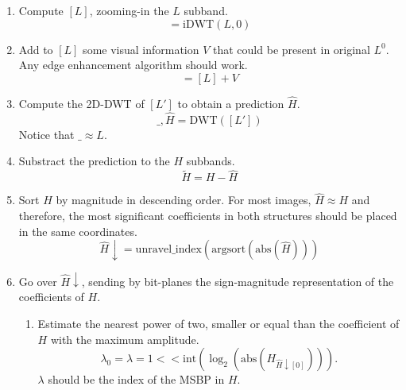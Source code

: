 \begin{enumerate}

\item Compute $[L]$, zooming-in the $L$ subband.
  \begin{equation}
    [L] = \text{iDWT}(L, 0)
  \end{equation}
  
\item Add to $[L]$ some visual information $V$ that could be present
  in original $L^0$. Any edge enhancement algorithm should work.
  \begin{equation}
    [L'] = [L] + V
  \end{equation}

\item Compute the 2D-DWT of $[L']$ to obtain a prediction $\hat{H}$.
  \begin{equation}
    \_, \hat{H} = \text{DWT}([L'])
  \end{equation}
  Notice that $\_\approx L$.

\item Substract the prediction to the $H$ subbands.
  \begin{equation}
    \tilde{H} = H-\hat{H}
  \end{equation}

\item Sort $\hat{H}$ by magnitude in descending order. For most
  images, $\hat{H}\approx H$ and therefore, the most significant
  coefficients in both structures should be placed in the same
  coordinates.
  \begin{equation}
    \hat{H}\downarrow = \text{unravel\_index}(\text{argsort}(\text{abs}(\hat{H})))
  \end{equation}

\item Go over $\hat{H}\downarrow$, sending by bit-planes the
  sign-magnitude representation of the coefficients of $H$.

  \begin{enumerate}

  \item Estimate the nearest power of two, smaller or equal than the
    coefficient of $H$ with the maximum amplitude.
    \begin{equation}
      \lambda_0 = \lambda = 1 << \text{int}(\log_2(\text{abs}(H_{\hat{H}\downarrow[0]}))).
    \end{equation}
    $\lambda$ should be the index of the MSBP in $H$.
    

\end{enumerate}
\end{enumerate}
